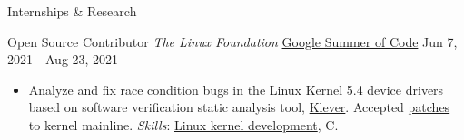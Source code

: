 \documentclass[]{mcdowellcv}
\begin{document}
\begin{cvsection}{Internships \& Research}
    \begin{cvsubsection}
      {Open Source Contributor \linebreak \textit{The Linux Foundation}}
      {\href{https://summerofcode.withgoogle.com/archive/2021/projects/4818588170452992}{Google Summer of Code}}
      {Jun 7, 2021 - Aug 23, 2021}
        \begin{itemize}
          \item
            Analyze and fix race condition bugs in the Linux Kernel 5.4 device
            drivers based on software verification static analysis tool,
            \href{https://forge.ispras.ru/projects/klever}{Klever}. Accepted
            \href{https://lore.kernel.org/lkml/?q=saubhik}{patches} to kernel
            mainline. \textit{Skills}: \href{https://www.kernel.org/}{Linux
            kernel development}, C.
        \end{itemize}
    \end{cvsubsection}
  \end{cvsection}
\end{document}
